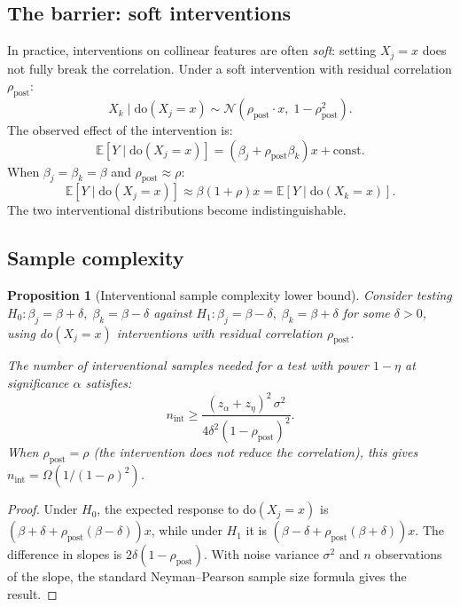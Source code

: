 \documentclass{article}
\newtheorem{proposition}[theorem]{Proposition}
\begin{document}
\subsection{The barrier: soft interventions}

In practice, interventions on collinear features are often
\emph{soft}: setting $X_j = x$ does not fully break the correlation.
Under a soft intervention with residual correlation $\rho_{\text{post}}$:
\[
    X_k \mid \text{do}(X_j = x) \sim
    \mathcal{N}(\rho_{\text{post}} \cdot x, \; 1 - \rho_{\text{post}}^2).
\]
The observed effect of the intervention is:
\[
    \mathbb{E}[Y \mid \text{do}(X_j = x)] = (\beta_j + \rho_{\text{post}} \beta_k) x
    + \text{const.}
\]
When $\beta_j = \beta_k = \beta$ and $\rho_{\text{post}} \approx \rho$:
\[
    \mathbb{E}[Y \mid \text{do}(X_j = x)] \approx \beta(1 + \rho) x
    = \mathbb{E}[Y \mid \text{do}(X_k = x)].
\]
The two interventional distributions become indistinguishable.

\subsection{Sample complexity}

\begin{proposition}[Interventional sample complexity lower bound]
\label{prop:causal-sample-complexity}
Consider testing $H_0: \beta_j = \beta + \delta, \; \beta_k = \beta - \delta$
against $H_1: \beta_j = \beta - \delta, \; \beta_k = \beta + \delta$
for some $\delta > 0$, using do$(X_j = x)$ interventions
with residual correlation $\rho_{\mathrm{post}}$.

The number of interventional samples needed for a test with power
$1 - \eta$ at significance $\alpha$ satisfies:
\[
    n_{\mathrm{int}} \geq
    \frac{(z_\alpha + z_\eta)^2 \, \sigma^2}{4\delta^2 (1 - \rho_{\mathrm{post}})^2}.
\]
When $\rho_{\mathrm{post}} = \rho$ (the intervention does not
reduce the correlation), this gives
$n_{\mathrm{int}} = \Omega(1/(1-\rho)^2)$.
\end{proposition}

\begin{proof}
Under $H_0$, the expected response to do$(X_j = x)$ is
$(\beta + \delta + \rho_{\mathrm{post}}(\beta - \delta))x$, while
under $H_1$ it is
$(\beta - \delta + \rho_{\mathrm{post}}(\beta + \delta))x$.
The difference in slopes is
$2\delta(1 - \rho_{\mathrm{post}})$. With noise variance $\sigma^2$
and $n$ observations of the slope, the standard Neyman--Pearson
sample size formula gives the result.
\end{proof}
\end{document}
